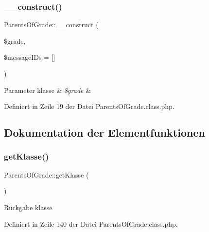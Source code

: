 \subsubsection{\texorpdfstring{\+\_\+\+\_\+construct()}{\_\_construct()}}
{\footnotesize\ttfamily Parents\+Of\+Grade\+::\+\_\+\+\_\+construct (\begin{DoxyParamCaption}\item[{}]{\$grade,  }\item[{}]{\$message\+I\+Ds = {\ttfamily \mbox{[}\mbox{]}} }\end{DoxyParamCaption})}


\begin{DoxyParams}[1]{Parameter}
klasse & {\em \$grade} & \\
\hline
\end{DoxyParams}


Definiert in Zeile 19 der Datei Parents\+Of\+Grade.\+class.\+php.



\subsection{Dokumentation der Elementfunktionen}
\mbox{\label{class_parents_of_grade_a5a77cad82ae67a5520fb2522c75e621b}} 
\subsubsection{\texorpdfstring{get\+Klasse()}{getKlasse()}}
{\footnotesize\ttfamily Parents\+Of\+Grade\+::get\+Klasse (\begin{DoxyParamCaption}{ }\end{DoxyParamCaption})}

\begin{DoxyReturn}{Rückgabe}
klasse 
\end{DoxyReturn}


Definiert in Zeile 140 der Datei Parents\+Of\+Grade.\+class.\+php.

\mbox{\label{class_parents_of_grade_ac8dd07cd080e74294ef2c6b50460bab0}} 
